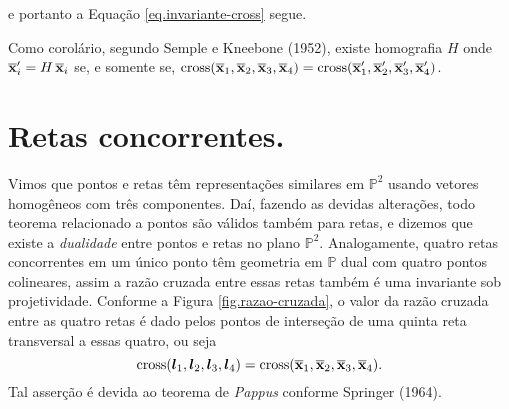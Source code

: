 e portanto a Equação \ref{eq.invariante-cross} segue.

Como corolário, segundo Semple e Kneebone (1952), existe homografia $H$ onde $\overline{\mathbf{x}}'_i=H\,\overline{\mathbf{x}}_i$ se, e somente se, $\text{cross}(\overline{\mathbf{x}}_1,\overline{\mathbf{x}}_2,\overline{\mathbf{x}}_3,\overline{\mathbf{x}}_4)=\text{cross}(\overline{\mathbf{x}}'_1,\overline{\mathbf{x}}'_2,\overline{\mathbf{x}}'_3,\overline{\mathbf{x}}'_4)$. 

%
%
%
%
\section*{Retas concorrentes.}
Vimos que pontos e retas têm representações similares em ${\mathbb{P}^2}$ usando vetores homogêneos com três componentes. Daí, fazendo as devidas alterações, todo teorema relacionado a pontos são válidos também para retas, e dizemos que existe a {\it dualidade} entre pontos e retas no plano ${\mathbb{P}^2}$. Analogamente,  
quatro retas concorrentes em um único ponto têm geometria em ${\mathbb{P}}$ dual com quatro pontos colineares, assim a razão cruzada entre essas retas também é uma invariante sob projetividade. Conforme a Figura \ref{fig.razao-cruzada}, o valor da razão cruzada entre as quatro retas é dado pelos pontos de interseção de uma quinta reta transversal a essas quatro, ou seja
\begin{equation*}
\text{cross}(\boldsymbol{l}_1,\boldsymbol{l}_2,\boldsymbol{l}_3,\boldsymbol{l}_4)=\text{cross}(\overline{\mathbf{x}}_1,\overline{\mathbf{x}}_2,\overline{\mathbf{x}}_3,\overline{\mathbf{x}}_4).
\end{equation*}
Tal asserção é devida ao teorema de \textit{Pappus} conforme Springer (1964). 
